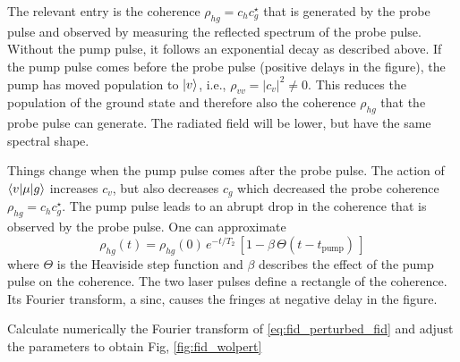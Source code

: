 The relevant entry is the  coherence  $\rho_{hg}  = c_h c_g^\star$ that is generated by the probe pulse and observed by measuring the reflected spectrum of the probe pulse. Without the pump pulse, it follows an exponential decay as described above. If the pump pulse comes before the probe pulse (positive delays in the figure), the pump has moved population to $\ket{v}$, i.e., $\rho_{vv}  = |c_v|^2 \neq 0 $. This reduces the population of the ground state and therefore also the coherence $\rho_{hg} $ that the probe pulse can generate. The radiated field will be lower, but have the same spectral shape.

Things change when the pump pulse comes after the probe pulse. The action of  $\braket{v| \mu | g}$ increases $c_v$, but also decreases $c_g$ which decreased the probe coherence  $\rho_{hg}  = c_h c_g^\star$. The pump pulse leads to an abrupt drop in the coherence that is observed by the probe pulse. One can approximate 
\begin{equation}
\rho_{hg}(t) = \rho_{hg}(0) \, e^{- t / T_2} \, \left[ 1  - \beta \, \Theta( t - t_\text{pump} ) \, \right] \label{eq:fid_perturbed_fid}
\end{equation}
where $\Theta$ is the Heaviside step function and $\beta$ describes the effect of the pump pulse on the coherence. The two laser pulses define a rectangle of the coherence. Its Fourier transform, a sinc, causes the fringes at negative delay in the figure.


\begin{questions}

\item Calculate numerically the Fourier transform of \ref{eq:fid_perturbed_fid} and adjust the parameters to obtain Fig, \ref{fig:fid_wolpert}

\end{questions}


\printbibliography[segment=\therefsegment,heading=subbibliography]
